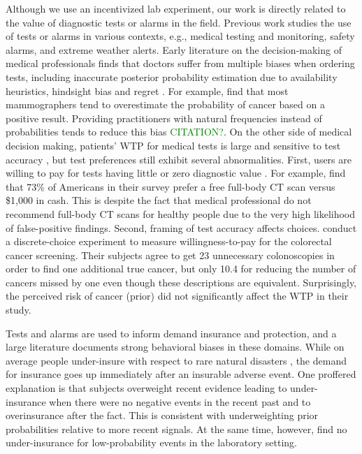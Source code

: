 \documentclass[12pt,a4paper]{article}
\begin{document}
Although we use an incentivized lab experiment, our work is directly related to the value of diagnostic tests or alarms in the field.  Previous work studies the use of tests or alarms in various contexts, e.g., medical testing and monitoring, safety alarms, and extreme weather alerts. Early literature on the decision-making of medical professionals finds that doctors suffer from multiple biases when ordering tests, including  inaccurate posterior probability estimation due to availability heuristics, hindsight bias and regret \citep{bornstein_rationality_2001}. For example, \citet{gigerenzer_helping_2007} find that most mammographers tend to overestimate the probability of cancer based on a positive result. Providing practitioners with natural frequencies instead of probabilities tends to reduce this bias \textcolor{green}{CITATION?}.  On the other side of medical decision making, patients' WTP for medical tests is large and sensitive to test accuracy \citep{liang_acceptability_2003, howard_does_2009, neumann_willingness--pay_2012}, but test preferences still exhibit several abnormalities. First, users are willing to pay for tests having little or zero diagnostic value \citep{schwartz_enthusiasm_2004, neumann_willingness--pay_2012}. For example, \citet{schwartz_enthusiasm_2004} find that 73\% of Americans in their survey prefer a free full-body CT scan versus \$1,000 in cash. This is despite the fact that medical professional do not recommend full-body CT scans for healthy people due to the very high likelihood of false-positive findings. Second, framing of test accuracy affects choices. \citet{howard_does_2009} conduct a discrete-choice experiment to measure willingness-to-pay for the colorectal cancer screening. Their subjects agree to get 23 unnecessary colonoscopies in order to find one additional true cancer, but only 10.4 for reducing the number of cancers missed by one even though these descriptions are equivalent. Surprisingly, the perceived risk of cancer (prior) did not significantly affect the WTP in their study.

Tests and alarms are used to inform demand insurance and protection, and a large literature documents strong behavioral biases in these domains. While on average people under-insure with respect to rare natural disasters \citep{friedl_insurance_2014}, the demand for insurance goes up immediately after an insurable adverse event. One proffered explanation is that subjects overweight recent evidence leading to under-insurance when there were no negative events in the recent past and to overinsurance after the fact\citep{volkman-wise_representativeness_2015}. This is consistent with underweighting prior probabilities relative to more recent signals. At the same time, however, \citet{laury_insurance_2009} find no under-insurance for low-probability events in the laboratory setting.  
\end{document}
